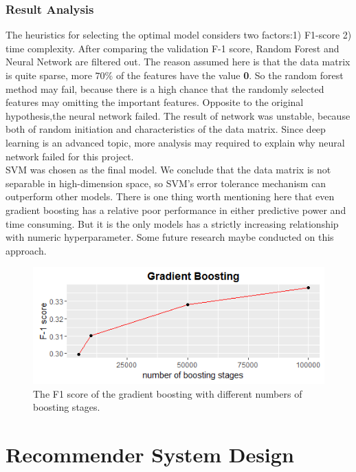 \documentclass{article}
\begin{document}
\subsubsection{Result Analysis}
The heuristics for selecting the optimal model considers two factors:1) F1-score 2) time complexity. After comparing the validation F-1 score, Random Forest and Neural Network are filtered out. The reason assumed here is that the data matrix is quite sparse, more $70\%$ of the features have the value \textbf{0}. So the random forest method may fail, because there is a high chance that the randomly selected features may omitting the important features. Opposite to the original hypothesis,the neural network failed. The result of network was unstable, because both of random initiation and characteristics of the data matrix. Since deep learning is an advanced topic, more analysis may required to explain why neural network failed for this project.\\

SVM was chosen as the final model. We conclude that the data matrix is not separable in high-dimension space, so SVM's error tolerance mechanism can outperform other models. There is one thing worth mentioning here that even gradient boosting has a relative poor performance in either predictive power and time consuming. But it is the only models has a strictly increasing relationship with numeric hyperparameter. Some future research maybe conducted on this approach.\\
\begin{figure}[H]
\begin{center}
\includegraphics[width=5.0in]{boosting.png}
\caption{The F1 score of the gradient boosting with different numbers of boosting stages.}%
\end{center}
\end{figure}

\section{Recommender System Design}
\end{document}
